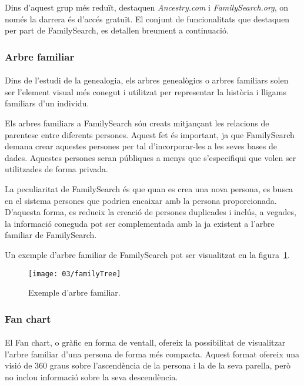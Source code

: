     Dins d’aquest grup més reduït, destaquen \emph{Ancestry.com} i \emph{FamilySearch.org}, on només la darrera és d’accés gratuït. El conjunt de funcionalitats que destaquen per part de FamilySearch, es detallen breument a continuació.


    \subsubsection{Arbre familiar}

    \paragraph{}
    Dins de l’estudi de la genealogia, els arbres genealògics o arbres familiars solen ser l’element visual més conegut i utilitzat per representar la història i lligams familiars d'un individu.

    Els arbres familiars a FamilySearch són creats mitjançant les relacions de pa\-ren\-tesc entre diferents persones. Aquest fet és important, ja que FamilySearch demana crear aquestes persones per tal d'incorporar-les a les seves bases de dades. Aquestes persones seran públiques a menys que s'especifiqui que volen ser utilitzades de forma privada.

    La peculiaritat de FamilySearch és que quan es crea una nova persona, es busca en el sistema persones que podrien encaixar amb la persona proporcionada. D'aquesta forma, es redueix la creació de persones duplicades i inclús, a vegades, la informació coneguda pot ser complementada amb la ja existent a l'arbre familiar de FamilySearch.

    Un exemple d'arbre familiar de FamilySearch  pot ser visualitzat en la figura~\ref{fig:familyTree3}.

    \begin{figure}[h]
        \texttt{[image: 03/familyTree]}
        \centering
        \caption{Exemple d'arbre familiar.\label{fig:familyTree3}}
    \end{figure}


    \subsubsection{Fan chart}

    \paragraph{}
    El Fan chart, o gràfic en forma de ventall, ofereix la possibilitat de visualitzar l'arbre familiar d'una persona de forma més compacta. Aquest format ofereix una visió de 360 graus sobre l'ascendència de la persona i la de la seva parella, però no inclou informació sobre la seva descendència.

